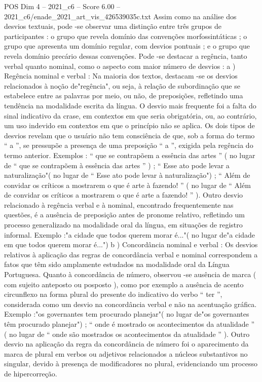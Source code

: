 \begin{textsample}{POS Dim 4 – 2021\_c6 – Score 6.00 – 2021\_c6/enade\_2021\_art\_vis\_426539035c.txt}
Assim como na análise dos desvios textuais, pode -se observar uma distinção entre três grupos de participantes : o grupo que revela domínio das convenções morfossintáticas ; o grupo que apresenta um domínio regular, com desvios pontuais ; e o grupo que revela domínio precário dessas convenções.
Pode -se destacar a regência, tanto verbal quanto nominal, como o aspecto com maior número de desvios : a ) Regência nominal e verbal : Na maioria dos textos, destacam -se os desvios relacionados à noção de"regência", ou seja, à relação de subordinação que se estabelece entre as palavras por meio, ou não, de preposições, refletindo uma tendência na modalidade escrita da língua.
O desvio mais frequente foi a falta do sinal indicativo da crase, em contextos em que seria obrigatória, ou, ao contrário, um uso indevido em contextos em que o princípio não se aplica.
Os dois tipos de desvios revelam que o usuário não tem consciência de que, sob a forma do termo “ a ”, se pressupõe a presença de uma preposição “ a ”, exigida pela regência do termo anterior.
Exemplos : “ que se contrapõem a essência das artes ” ( no lugar de “ que se contrapõem à essência das artes ” ) ; “ Esse ato pode levar a naturalização"( no lugar de “ Esse ato pode levar à naturalização") ; “ Além de convidar os críticos a mostrarem o que é arte à fazendo! ” ( no lugar de “ Além de convidar os críticos a mostrarem o que é arte a fazendo! ” ).
Outro desvio relacionado à regência verbal e à nominal, encontrado frequentemente nas questões, é a ausência de preposição antes de pronome relativo, refletindo um processo generalizado na modalidade oral da língua, em situações de registro informal.
Exemplo :"a cidade que todos querem morar é..."( no lugar de"a cidade em que todos querem morar é...") b ) Concordância nominal e verbal : Os desvios relativos à aplicação das regras de concordância verbal e nominal correspondem a fatos que têm sido amplamente estudados na modalidade oral da Língua Portuguesa.
Quanto à concordância de número, observou -se ausência de marca ( com sujeito anteposto ou posposto ), como por exemplo a ausência de acento circunflexo na forma plural do presente do indicativo do verbo “ ter ”, considerada como um desvio na concordância verbal e não na acentuação gráfica.
Exemplo :"os governantes tem procurado planejar"( no lugar de"os governantes têm procurado planejar") ; “ onde é mostrado os acontecimentos da atualidade ” ( no lugar de “ onde são mostrados os acontecimentos da atualidade ” ).
Outro desvio na aplicação da regra da concordância de número foi o aparecimento da marca de plural em verbos ou adjetivos relacionados a núcleos substantivos no singular, devido à presença de modificadores no plural, evidenciando um processo de hipercorreção.

\end{textsample}
